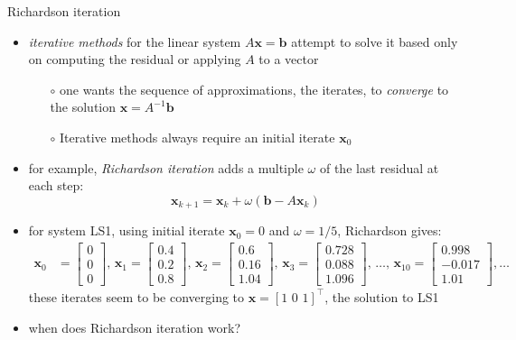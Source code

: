 \documentclass[10pt,hyperref]{beamer}
\newcommand{\bb}{\mathbf{b}}
\newcommand{\bx}{\mathbf{x}}
\begin{document}
\begin{frame}{Richardson iteration}

\begin{itemize}
\item \emph{iterative methods} for the linear system $A\bx=\bb$ attempt to solve it based only on computing the residual or applying $A$ to a vector
  \begin{itemize}
  \item[$\circ$] one wants the sequence of approximations, the iterates, to \emph{converge} to the solution $\bx = A^{-1} \bb$
  \item[$\circ$] Iterative methods always require an initial iterate $\bx_0$
  \end{itemize}
\item for example, \emph{Richardson iteration} adds a multiple $\omega$ of the last residual at each step:
\begin{equation}
\bx_{k+1} = \bx_k + \omega (\bb - A \bx_k)  \label{richardson}
\end{equation}
\item for system LS1, using initial iterate $\bx_0=0$ and $\omega=1/5$, Richardson gives:\small
\begin{align*}
\bx_0 &= \begin{bmatrix} 0 \\ 0 \\ 0 \end{bmatrix}, \,
\bx_1 = \begin{bmatrix} 0.4 \\ 0.2 \\ 0.8 \end{bmatrix}, \,
\bx_2 = \begin{bmatrix} 0.6 \\ 0.16 \\ 1.04 \end{bmatrix}, \,
\bx_3 = \begin{bmatrix} 0.728 \\ 0.088 \\ 1.096 \end{bmatrix}, \, \dots, \,
\bx_{10} = \begin{bmatrix} 0.998 \\ -0.017 \\ 1.01 \end{bmatrix},
\dots
\end{align*}
these iterates seem to be converging to $\bx = [1 \,\, 0 \,\, 1]^\top$, the solution to LS1
\item when does Richardson iteration work?
\end{itemize}
\end{frame}
\end{document}
